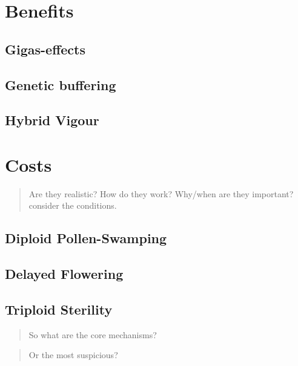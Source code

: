 \documentclass[openany, 12pt, draft]{book}
\begin{document}
\hypertarget{benefits}{%
\section{Benefits}\label{benefits}}

\hypertarget{gigas}{%
\subsection{Gigas-effects}\label{gigas}}

\hypertarget{buffering}{%
\subsection{Genetic buffering}\label{buffering}}

\hypertarget{vigour}{%
\subsection{Hybrid Vigour}\label{vigour}}

\hypertarget{costs}{%
\section{Costs}\label{costs}}

\begin{quote}
Are they realistic? How do they work? Why/when are they important? consider the conditions.
\end{quote}

\hypertarget{pollen-swamping}{%
\subsection{Diploid Pollen-Swamping}\label{pollen-swamping}}

\hypertarget{flowering}{%
\subsection{Delayed Flowering}\label{flowering}}

\hypertarget{sterility}{%
\subsection{Triploid Sterility}\label{sterility}}

\begin{quote}
So what are the core mechanisms?
\end{quote}

\begin{quote}
Or the most suspicious?
\end{quote}
\end{document}
